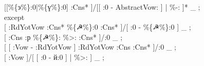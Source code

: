 \documentclass[a0paper,fontscale=0.3]{baposter}  %
\begin{document}
\begin{poster}
{{\begin{spacing}{0.4}
\hspace*{0.1em}\hfill{} [[\%\{э\%\}:0|\%\{ү\%\}:0] :Cns* ]/[[ :0 - AbstractVow: ] | \%-: ]* \_ ; \\
\hspace*{4em}        except \\
\hspace*{0.1em}\hfill{}       [ :RdYotVow :Cns* \%\{☭\%\}:0 :Cns* ]/[ :0 - \%\{☭\%\}:0 ] \_ ; \\ %
\hspace*{0.1em}\hfill{}                          [ :Cns :р \%\{☭\%\}: \%>: :Cns* ]/:0 \_ ; \\%
\hspace*{0.1em}\hfill{}         [ [ :Vow - :RdYotVow ] :RdYotVow :Cns :Cns* ]/:0 \_ ; \\%
\hspace*{0.1em}\hfill{}                          [ :Vow ]/[ [ :0 - й:0 ] | \%>: ] \_ ;
					\end{spacing}
				}\\

		}


\end{poster}
\end{document}
